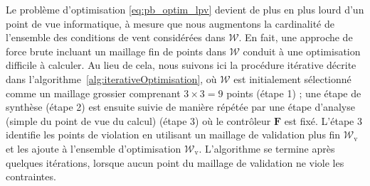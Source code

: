 Le problème d'optimisation \eqref{eq:pb_optim_lpv} devient de plus en plus lourd d'un point de vue informatique, à mesure que nous augmentons la cardinalité de l'ensemble des conditions de vent considérées dans ${\mathcal W}$. En fait, une approche de force brute incluant un maillage fin de points dans ${\mathcal W}$ conduit à une optimisation difficile à calculer. Au lieu de cela, nous suivons ici la procédure itérative décrite dans l'algorithme~\ref{alg:iterativeOptimisation}, où ${\mathcal W}$ est initialement sélectionné comme un maillage grossier comprenant $3 \times 3 = 9$ points (étape 1) ; une étape de synthèse (étape 2) est ensuite suivie de manière répétée par une étape d'analyse (simple du point de vue du calcul) (étape 3) où le contrôleur $\boldsymbol{F}$ est fixé.
L'étape 3 identifie les points de violation en utilisant un maillage de validation plus fin ${\mathcal W}_{\text{v}}$ et les ajoute à l'ensemble d'optimisation ${\mathcal W}_{\text{v}}$. L'algorithme se termine après quelques itérations, lorsque aucun point du maillage de validation ne viole les contraintes.

